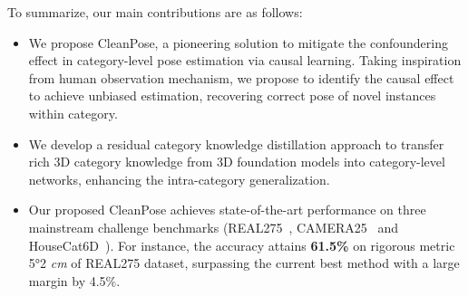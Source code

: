 To summarize, our main contributions are as follows:
\begin{itemize}
    \item We propose CleanPose, a pioneering solution to mitigate the confoundering effect in category-level pose estimation via causal learning. Taking inspiration from human observation mechanism, we propose to identify the causal effect to achieve unbiased estimation, recovering correct pose of novel instances within category.
    \item We develop a residual category knowledge distillation approach to transfer rich 3D category knowledge from 3D foundation models into category-level networks, enhancing the intra-category generalization. 
    \item Our proposed CleanPose achieves state-of-the-art performance on three mainstream challenge benchmarks (REAL275~\cite{wang2019normalized}, CAMERA25~\cite{wang2019normalized} and HouseCat6D~\cite{jung2024housecat6d}). For instance, the accuracy attains \textbf{61.5\%} on rigorous metric 5°2 \emph{cm} of REAL275 dataset, surpassing the current best method with a large margin by 4.5\%.
\end{itemize}


